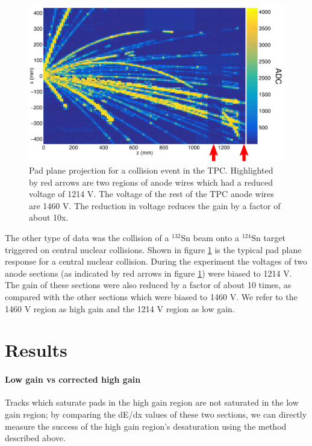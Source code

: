 \documentclass[review]{elsarticle}
\begin{document}
\begin{figure}[H]
\includegraphics[width=\linewidth]{data.pdf}
\caption{Pad plane projection for a collision event in the TPC. Highlighted by red arrows are two regions of anode wires which had a reduced voltage of 1214 V. The voltage of the rest of the TPC anode wires are 1460 V. The reduction in voltage reduces the gain by a factor of about 10x. }
\label{fig:data}
\end{figure}

The other type of data was the collision of a ${}^{132}$Sn beam onto a ${}^{124}$Sn target triggered on central nuclear collisions. Shown in figure \ref{fig:data} is the typical pad plane response for a central nuclear collision. During the experiment the voltages of two anode sections (as indicated by red arrows in figure \ref{fig:data}) were biased to 1214 V. The gain of these sections were also reduced by a factor of about 10 times, as compared with the other sections which were biased to 1460 V. We refer to the 1460 V region as high gain and the 1214 V region as low gain. 


\section{Results}
\paragraph{Low gain vs corrected high gain}

Tracks which saturate pads in the high gain region are not saturated in the low gain region; by comparing the dE/dx values of these two sections, we can directly measure the success of the high gain region's desaturation using the method described above.  
\end{document}
